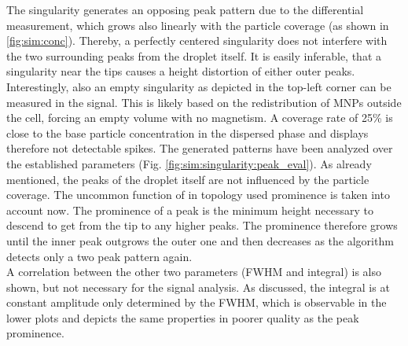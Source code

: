 The singularity generates an opposing peak pattern due to the differential measurement, which grows also linearly with the particle coverage (as shown in \ref{fig:sim:conc}). Thereby, a perfectly centered singularity does not interfere with the two surrounding peaks from the droplet itself. It is easily inferable, that a singularity near the tips causes a height distortion of either outer peaks. \\
Interestingly, also an empty singularity as depicted in the top-left corner can be measured in the signal. This is likely based on the redistribution of MNPs outside the cell, forcing an empty volume with no magnetism. A coverage rate of 25\% is close to the base particle concentration in the dispersed phase and displays therefore not detectable spikes.
\newpage
The generated patterns have been analyzed over the established parameters (Fig. \ref{fig:sim:singularity:peak_eval}). As already mentioned, the peaks of the droplet itself are not influenced by the particle coverage.
The uncommon function of in topology used prominence is taken into account now. The prominence of a peak is the minimum height necessary to descend to get from the tip to any higher peaks. The prominence therefore grows until the inner peak outgrows the outer one and then decreases as the algorithm detects only a two peak pattern again.
\\
A correlation between the other two parameters (FWHM and integral) is also shown, but not necessary for the signal analysis. As discussed, the integral is at constant amplitude only determined by the FWHM, which is observable in the lower plots and depicts the same properties in poorer quality as the peak prominence.
